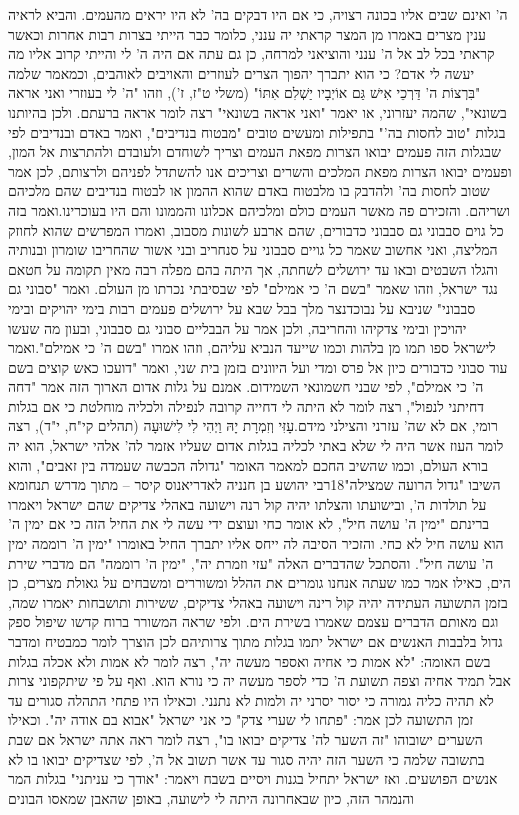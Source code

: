 \documentclass[12pt, openany]{book}
\begin{document}
ה' ואינם שבים אליו בכונה רצויה, כי אם היו דבקים בה' לא היו יראים מהעמים. והביא לראיה ענין מצרים באמרו מן המצר קראתי יה ענני, כלומר כבר הייתי בצרות רבות אחרות וכאשר קראתי בכל לב אל ה' ענני והוציאני למרחה, כן גם עתה אם היה ה' לי והייתי קרוב אליו מה יעשה לי אדם? כי הוא יתברך יהפוך הצרים לעוזרים והאויבים לאוהבים, וכמאמר שלמה "בִּרְצוֹת ה' דַּרְכֵי אִישׁ גַּם אוֹיְבָיו יַשְׁלִם אִתּוֹ" (משלי ט"ז, ז'), וזהו "ה' לי בעוזרי ואני אראה בשונאי", שהמה יעזרוני, או יאמר "ואני אראה בשונאי" רצה לומר אראה ברעתם. ולכן בהיותנו בגלות "טוב לחסות בה'" בתפילות ומעשים טובים "מבטוח בנדיבים", ואמר באדם ובנדיבים לפי שבגלות הזה פעמים יבואו הצרות מפאת העמים וצריך לשוחדם ולעובדם ולהתרצות אל המון, ופעמים יבואו הצרות מפאת המלכים והשרים וצריכים אנו להשתדל לפניהם ולרצותם, לכן אמר שטוב לחסות בה' ולהדבק בו מלבטוח באדם שהוא ההמון או לבטוח בנדיבים שהם מלכיהם ושריהם. והזכירם פה מאשר העמים כולם ומלכיהם אכלונו והממונו והם היו בעוכרינו.ואמר בזה כל גוים סבבוני גם סבבוני כדבורים, שהם ארבע לשונות מסבוב, ואמרו המפרשים שהוא לחוזק המליצה, ואני אחשוב שאמר כל גויים סבבוני על סנחריב ובני אשור שהחריבו שומרון ובנותיה והגלו השבטים ובאו עד ירושלים לשחתה, אך היתה בהם מפלה רבה מאין תקומה על חטאם נגד ישראל, וזהו שאמר "בשם ה' כי אמילם" לפי שבסיבתי נכרתו מן העולם. ואמר "סבוני גם סבבוני" שניבא על נבוכדנצר מלך בבל שבא על ירושלים פעמים רבות בימי יהויקים ובימי יהויכין ובימי צדקיהו והחריבה, ולכן אמר על הבבליים סבוני גם סבבוני, ובעון מה שעשו לישראל ספו תמו מן בלהות וכמו שייעד הנביא עליהם, וזהו אמרו "בשם ה' כי אמילם".ואמר עוד סבוני כדבורים כיון אל פרס ומדי ועל היוונים בזמן בית שני, ואמר "דועכו כאש קוצים בשם ה' כי אמילם", לפי שבני חשמונאי השמידום. אמנם על גלות אדום הארוך הזה אמר "דחה דחיתני לנפול", רצה לומר לא היתה לי דחייה קרובה לנפילה ולכליה מוחלטת כי אם בגלות רומי, אם לא שה' עזרני והצילני מידם.עָזִּי וְזִמְרָת יָהּ וַיְהִי לִי לִישׁוּעָה (תהלים קי"ח, י"ד), רצה לומר העוז אשר היה לי שלא באתי לכליה בגלות אדום שעליו אזמר לה' אלהי ישראל, הוא יה בורא העולם, וכמו שהשיב החכם למאמר האומר "גדולה הכבשה שעמדה בין זאבים", והוא השיבו "גדול הרועה שמצילה"18רבי יהושע בן חנניה לאדריאנוס קיסר – מתוך מדרש תנחומא על תולדות ה', ובישועתו והצלתו יהיה קול רנה וישועה באהלי צדיקים שהם ישראל ויאמרו ברינתם "ימין ה' עושה חיל", לא אומר כחי ועוצם ידי עשה לי את החיל הזה כי אם ימין ה' הוא עושה חיל לא כחי. והזכיר הסיבה לה ייחס אליו יתברך החיל באומרו "ימין ה' רוממה ימין ה' עושה חיל". והסתכל שהדברים האלה "עזי וזמרת יה", "ימין ה' רוממה" הם מדברי שירת הים, כאילו אמר כמו שעתה אנחנו גומרים את ההלל ומשוררים ומשבחים על גאולת מצרים, כן בזמן התשועה העתידה יהיה קול רינה וישועה באהלי צדיקים, ששירות ותושבחות יאמרו שמה, וגם מאותם הדברים עצמם שאמרו בשירת הים. ולפי שראה המשורר ברוח קדשו שיפול ספק גדול בלבבות האנשים אם ישראל יתמו בגלות מתוך צרותיהם לכן הוצרך לומר כמבטיח ומדבר בשם האומה: "לא אמות כי אחיה ואספר מעשה יה", רצה לומר לא אמות ולא אכלה בגלות אבל תמיד אחיה וצפה תשועת ה' כדי לספר מעשה יה כי נורא הוא. ואף על פי שיתקפוני צרות לא תהיה כליה גמורה כי יסור יסרני יה ולמות לא נתנני. וכאילו היו פתחי התהלה סגורים עד זמן התשועה לכן אמר: "פתחו לי שערי צדק" כי אני ישראל  "אבוא בם אודה יה". וכאילו השערים ישובוהו "זה השער לה' צדיקים יבואו בו", רצה לומר ראה אתה ישראל אם שבת בתשובה שלמה כי השער הזה יהיה סגור עד אשר תשוב אל ה', לפי שצדיקים יבואו בו לא אנשים הפושעים. ואז ישראל יתחיל בגנות ויסיים בשבח ויאמר: "אודך כי עניתני" בגלות המר והנמהר הזה, כיון שבאחרונה היתה לי לישועה, באופן שהאבן שמאסו הבונים 
\end{document}

